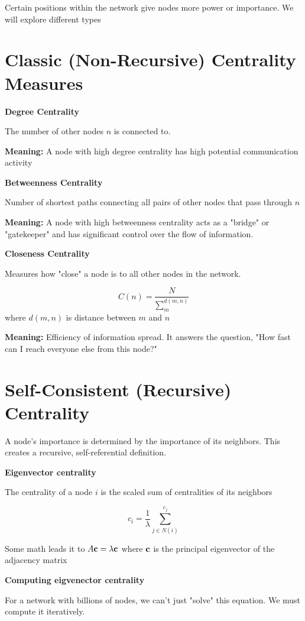 Certain positions within the network give nodes more power or importance.
We will explore different types

\section*{Classic (Non-Recursive) Centrality Measures}

\textbf{Degree Centrality}

The number of other nodes $n$ is connected to. 

\textbf{Meaning:} A node with high degree centrality 
has high potential communication activity

\textbf{Betweenness Centrality}

Number of shortest paths connecting all pairs of other nodes that pass through $n$

\textbf{Meaning:} A node with high betweenness centrality acts as a "bridge" or "gatekeeper"
and has significant control over the flow of information.

\textbf{Closeness Centrality}

Measures how "close" a node is to all other nodes in the network.

\[
C(n) = \frac{N}{\sum_{m}^{d(m, n)}}
\]
where $d(m, n)$ is distance between $m$ and $n$

\textbf{Meaning:} Efficiency of information spread. It answers the question,
"How fast can I reach everyone else from this node?"

\section*{Self-Consistent (Recursive) Centrality}

A node's importance is determined by the importance of its neighbors. 
This creates a recursive, self-referential definition.

\textbf{Eigenvector centrality}

The centrality of a node $i$ is the scaled sum of centralities of its neighbors

\[
c_i = \frac{1}{\lambda} \sum_{j \in N(i)}^{c_j}
\]

Some math leads it to $A \mathbf{c} = \lambda \mathbf{c}$ where $\mathbf{c}$ is the principal 
eigenvector of the adjacency matrix

\textbf{Computing eigvenector centrality}

For a network with billions of nodes, we can't just "solve" this equation. We must compute it iteratively.


